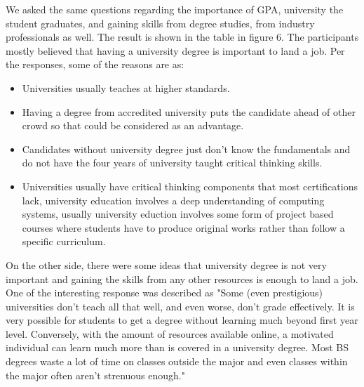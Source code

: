 \documentclass{sigchi}
\begin{document}
We asked the same questions regarding the importance of GPA, university the student graduates, and gaining skills from degree studies, from industry professionals as well. The result is shown in the table in figure 6.
The participants mostly believed that having a university degree is important to land a job. Per the responses, some of the reasons are as:
\begin{itemize}
	\item Universities usually teaches at higher standards.
	\item Having a degree from accredited university puts the candidate ahead of other crowd so that could be considered as an advantage.
	\item Candidates without university degree just don't know the fundamentals and do not have the four years of university taught critical thinking skills.
	\item Universities usually have critical thinking components that most certifications lack, university education involves a deep understanding of computing systems, usually university eduction involves some form of project based courses where students have to produce original works rather than follow a specific curriculum.
\end{itemize}
On the other side, there were some ideas that university degree is not very important and gaining the skills from any other resources is enough to land a job. One of the interesting response was described as "Some (even prestigious) universities don't teach all that well, and even worse, don't grade effectively. It is very possible for students to get a degree without learning much beyond first year level. Conversely, with the amount of resources available online, a motivated individual can learn much more than is covered in a university degree. Most BS degrees waste a lot of time on classes outside the major and even classes within the major often aren't strenuous enough."
 
\end{document}
